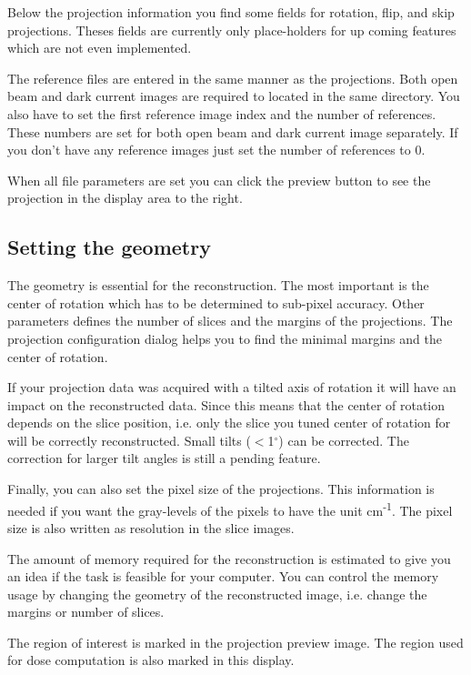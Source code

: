 \documentclass[a4paper]{scrreprt}
\begin{document}
Below the projection information you find some fields for rotation, flip, and skip projections. Theses fields are currently only place-holders for up coming features which are not even implemented.

The reference files are entered in the same manner as the projections. Both open beam and
dark current images are required to located in the same directory. You also have to set
the first reference image index and the number of references. These numbers are set for
both open beam and dark current image separately. If you don't have any reference images just set the number of references to 0.

When all file parameters are set you can click the preview button to see the projection in the display area to the right.

\subsection{Setting the geometry}
The geometry is essential for the reconstruction. The most important is the center of rotation
which has to be determined to sub-pixel accuracy. Other parameters defines the number of slices and the margins
of the projections. The projection configuration dialog helps you to find the minimal margins and the center of rotation.

If your projection data was acquired with a tilted axis of rotation it will have
an impact on the reconstructed data.
Since this means that the center of rotation depends on the slice position, i.e.
only the slice you tuned center of rotation for will be correctly reconstructed.
Small tilts ($<$1$^{\circ}$) can be corrected. The correction for larger tilt
angles is still a pending feature.

Finally, you can also set the pixel size of the projections. This information is needed if
you want the gray-levels of the pixels to have the unit cm\textsuperscript{-1}.
The pixel size is also written as resolution in the slice images.

The amount of memory required for the reconstruction is estimated to give you
an idea if the task is feasible for your computer. You can control the memory
usage by changing the geometry of the reconstructed image, i.e. change the
margins or number of slices.

The region of interest is marked in the projection preview image. The region
used for dose computation is also marked in this display.
\end{document}

